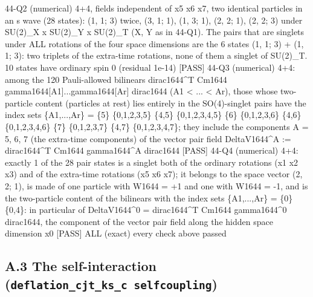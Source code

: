 \documentclass[
  10pt,
]{article}
\newenvironment{Shaded}{}{}
\newcommand{\NormalTok}[1]{#1}
\begin{document}
\begin{Shaded}
\begin{Highlighting}[]
\NormalTok{[PASS] 44{-}Q2  (numerical) 4+4, fields independent of x5 x6 x7, two identical particles in an s wave (28 states): (1, 1; 3) twice, (3, 1; 1), (1, 3; 1), (2, 2; 1), (2, 2; 3) under SU(2)\_X x SU(2)\_Y x SU(2)\_T (X, Y as in 44{-}Q1).  The pairs that are singlets under ALL rotations of the four space dimensions are the 6 states (1, 1; 3) + (1, 1; 3): two triplets of the extra{-}time rotations, none of them a singlet of SU(2)\_T.  10 states have ordinary spin 0 (residual 1e{-}14)}
\NormalTok{[PASS] 44{-}Q3  (numerical) 4+4: among the 120 Pauli{-}allowed bilinears dirac1644\^{}T Cm1644 gamma1644[A1]...gamma1644[Ar] dirac1644 (A1 \textless{} ... \textless{} Ar), those whose two{-}particle content (particles at rest) lies entirely in the SO(4){-}singlet pairs have the index sets \{A1,...,Ar\} = \{5\} \{0,1,2,3,5\} \{4,5\} \{0,1,2,3,4,5\} \{6\} \{0,1,2,3,6\} \{4,6\} \{0,1,2,3,4,6\} \{7\} \{0,1,2,3,7\} \{4,7\} \{0,1,2,3,4,7\}; they include the components A = 5, 6, 7 (the extra{-}time components) of the vector pair field DeltaV1644\^{}A := dirac1644\^{}T Cm1644 gamma1644\^{}A dirac1644}
\NormalTok{[PASS] 44{-}Q4  (numerical) 4+4: exactly 1 of the 28 pair states is a singlet both of the ordinary rotations (x1 x2 x3) and of the extra{-}time rotations (x5 x6 x7); it belongs to the space vector (2, 2; 1), is made of one particle with W1644 = +1 and one with W1644 = {-}1, and is the two{-}particle content of the bilinears with the index sets \{A1,...,Ar\} = \{0\} \{0,4\}: in particular of DeltaV1644\^{}0 = dirac1644\^{}T Cm1644 gamma1644\^{}0 dirac1644, the component of the vector pair field along the hidden space dimension x0}
\NormalTok{[PASS] ALL  (exact) every check above passed}
\end{Highlighting}
\end{Shaded}

\hypertarget{a.3-the-self-interaction-deflation_cjt_ks_c-selfcoupling}{%
\subsection{\texorpdfstring{A.3 The self-interaction
(\texttt{deflation\_cjt\_ks\_c\ selfcoupling})}{A.3 The self-interaction (deflation\_cjt\_ks\_c selfcoupling)}}\label{a.3-the-self-interaction-deflation_cjt_ks_c-selfcoupling}}
\end{document}
